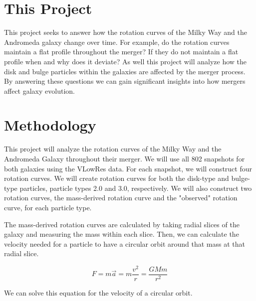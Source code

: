 \documentclass[twocolumn,linenumbers,trackchanges]{aastex7}
\begin{document}
\section{This Project}
This project seeks to answer how the rotation curves of the Milky Way and the Andromeda galaxy change over time.
For example, do the rotation curves maintain a flat profile throughout the merger?
If they do not maintain a flat profile when and why does it deviate?
As well this project will analyze how the disk and bulge particles within the galaxies are affected by the merger process. 
By answering these questions we can gain significant insights into how mergers affect galaxy evolution.

\section{Methodology}
This project will analyze the rotation curves of the Milky Way and the Andromeda Galaxy throughout their merger. 
We will use all 802 snapshots for both galaxies using the VLowRes data. For each snapshot, we will construct four rotation curves.
We will create rotation curves for both the disk-type and bulge-type particles, particle types 2.0 and 3.0, respectively.
We will also construct two rotation curves, the mass-derived rotation curve and the "observed" rotation curve, for each particle type.

The mass-derived rotation curves are calculated by taking radial slices of the galaxy and measuring the mass within each slice. Then, we can calculate the velocity needed for a particle to have a circular orbit around that mass at that radial slice.

\begin{equation}
	F=m\overrightarrow{a}=m\frac{v^2}{r}=\frac{GMm}{r^2}
\end{equation}

We can solve this equation for the velocity of a circular orbit.
\end{document}
